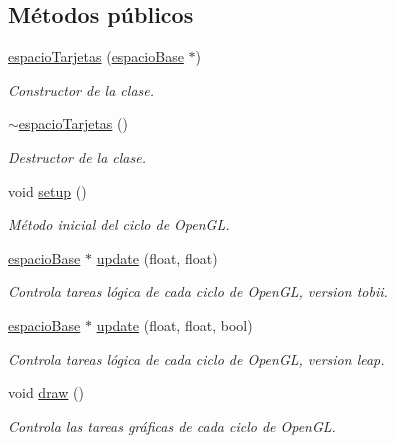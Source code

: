 \subsection*{Métodos públicos}
\begin{DoxyCompactItemize}
\item 
\hyperlink{classespacio_tarjetas_a4fadd23e0a493467f5c28deecdbb975c}{espacio\+Tarjetas} (\hyperlink{classespacio_base}{espacio\+Base} $\ast$)
\begin{DoxyCompactList}\small\item\em Constructor de la clase. \end{DoxyCompactList}\item 
\hyperlink{classespacio_tarjetas_a2b5ef7680cf2193c561814d90fcc1500}{$\sim$espacio\+Tarjetas} ()
\begin{DoxyCompactList}\small\item\em Destructor de la clase. \end{DoxyCompactList}\item 
void \hyperlink{classespacio_tarjetas_a0dc8d9154c4de90daab303a4fab5fd90}{setup} ()
\begin{DoxyCompactList}\small\item\em Método inicial del ciclo de Open\+G\+L. \end{DoxyCompactList}\item 
\hyperlink{classespacio_base}{espacio\+Base} $\ast$ \hyperlink{classespacio_tarjetas_a3605dfcf054ea79c7ddb3c335bac12d4}{update} (float, float)
\begin{DoxyCompactList}\small\item\em Controla tareas lógica de cada ciclo de Open\+G\+L, version tobii. \end{DoxyCompactList}\item 
\hyperlink{classespacio_base}{espacio\+Base} $\ast$ \hyperlink{classespacio_tarjetas_aa2cc230a9c7bd367364f0651ada06c73}{update} (float, float, bool)
\begin{DoxyCompactList}\small\item\em Controla tareas lógica de cada ciclo de Open\+G\+L, version leap. \end{DoxyCompactList}\item 
void \hyperlink{classespacio_tarjetas_a53e047fce1e887a4dfc49ff31388867d}{draw} ()
\begin{DoxyCompactList}\small\item\em Controla las tareas gráficas de cada ciclo de Open\+G\+L. \end{DoxyCompactList}\end{DoxyCompactItemize}
